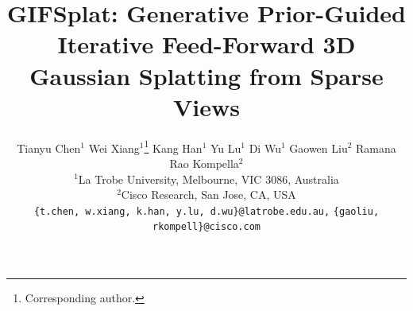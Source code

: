 \documentclass[10pt,twocolumn,letterpaper]{article}
\title{GIFSplat: Generative Prior-Guided Iterative Feed-Forward 3D Gaussian Splatting from Sparse Views}
\author{Tianyu Chen$^{1}$ \quad Wei Xiang$^{1}$\thanks{Corresponding author.} \quad Kang Han$^{1}$ \quad Yu Lu$^{1}$ \quad Di Wu$^{1}$ \quad Gaowen Liu$^{2}$ \quad Ramana Rao Kompella$^{2}$ \\
{\normalsize $^1$La Trobe University, Melbourne, VIC 3086, Australia}\\
{\normalsize $^2$Cisco Research, San Jose, CA, USA}\\
{\tt\small \{t.chen, w.xiang, k.han, y.lu, d.wu\}@latrobe.edu.au,}
{\tt\small \{gaoliu, rkompell\}@cisco.com}
}
\begin{document}
\maketitle
    







{
    \small
    
    
}

%
\end{document}
